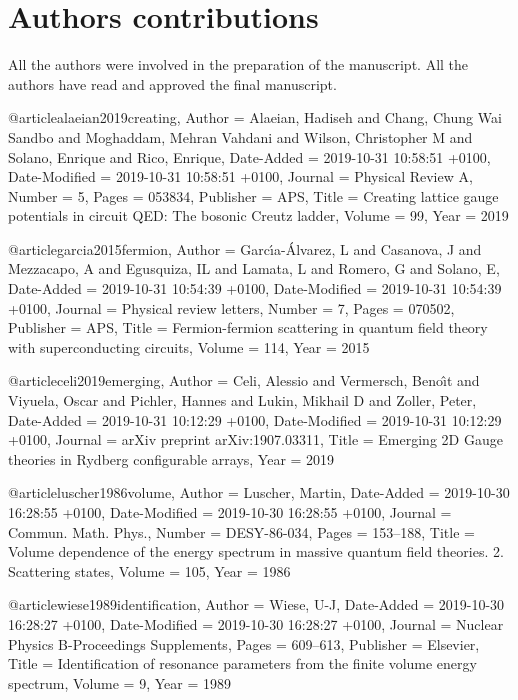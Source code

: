 \documentclass[epj,final]{svjour}
\begin{document}
\section{Authors contributions}
All the authors were involved in the preparation of the manuscript. All the authors have read and approved the final manuscript.












@article{alaeian2019creating,
	Author = {Alaeian, Hadiseh and Chang, Chung Wai Sandbo and Moghaddam, Mehran Vahdani and Wilson, Christopher M and Solano, Enrique and Rico, Enrique},
	Date-Added = {2019-10-31 10:58:51 +0100},
	Date-Modified = {2019-10-31 10:58:51 +0100},
	Journal = {Physical Review A},
	Number = {5},
	Pages = {053834},
	Publisher = {APS},
	Title = {Creating lattice gauge potentials in circuit QED: The bosonic Creutz ladder},
	Volume = {99},
	Year = {2019}}

@article{garcia2015fermion,
	Author = {Garc{\'\i}a-{\'A}lvarez, L and Casanova, J and Mezzacapo, A and Egusquiza, IL and Lamata, L and Romero, G and Solano, E},
	Date-Added = {2019-10-31 10:54:39 +0100},
	Date-Modified = {2019-10-31 10:54:39 +0100},
	Journal = {Physical review letters},
	Number = {7},
	Pages = {070502},
	Publisher = {APS},
	Title = {Fermion-fermion scattering in quantum field theory with superconducting circuits},
	Volume = {114},
	Year = {2015}}

@article{celi2019emerging,
	Author = {Celi, Alessio and Vermersch, Beno{\^\i}t and Viyuela, Oscar and Pichler, Hannes and Lukin, Mikhail D and Zoller, Peter},
	Date-Added = {2019-10-31 10:12:29 +0100},
	Date-Modified = {2019-10-31 10:12:29 +0100},
	Journal = {arXiv preprint arXiv:1907.03311},
	Title = {Emerging 2D Gauge theories in Rydberg configurable arrays},
	Year = {2019}}

@article{luscher1986volume,
	Author = {Luscher, Martin},
	Date-Added = {2019-10-30 16:28:55 +0100},
	Date-Modified = {2019-10-30 16:28:55 +0100},
	Journal = {Commun. Math. Phys.},
	Number = {DESY-86-034},
	Pages = {153--188},
	Title = {Volume dependence of the energy spectrum in massive quantum field theories. 2. Scattering states},
	Volume = {105},
	Year = {1986}}

@article{wiese1989identification,
	Author = {Wiese, U-J},
	Date-Added = {2019-10-30 16:28:27 +0100},
	Date-Modified = {2019-10-30 16:28:27 +0100},
	Journal = {Nuclear Physics B-Proceedings Supplements},
	Pages = {609--613},
	Publisher = {Elsevier},
	Title = {Identification of resonance parameters from the finite volume energy spectrum},
	Volume = {9},
	Year = {1989}}
\end{document}
